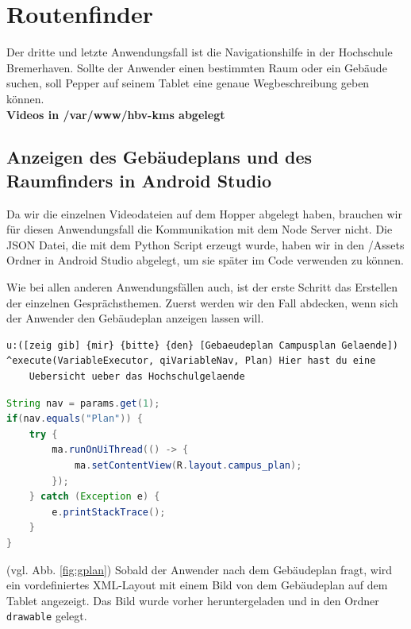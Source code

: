 \section{Routenfinder}

Der dritte und letzte Anwendungsfall ist die Navigationshilfe in der Hochschule Bremerhaven. Sollte der Anwender einen bestimmten Raum oder ein Gebäude suchen, soll Pepper auf seinem Tablet eine genaue Wegbeschreibung geben können. 
\\
\textbf{Videos in /var/www/hbv-kms abgelegt}
\\


\subsection{Anzeigen des Gebäudeplans und des Raumfinders in Android Studio}

Da wir die einzelnen Videodateien auf dem Hopper abgelegt haben, brauchen wir für diesen Anwendungsfall die Kommunikation mit dem Node Server nicht. 
Die JSON Datei, die mit dem Python Script erzeugt wurde, haben wir in den /Assets Ordner in Android Studio abgelegt, um sie später im Code verwenden zu können. 

Wie bei allen anderen Anwendungsfällen auch, ist der erste Schritt das Erstellen der einzelnen Gesprächsthemen. 
Zuerst werden wir den Fall abdecken, wenn sich der Anwender den Gebäudeplan anzeigen lassen will.\\

\begin{lstlisting}
u:([zeig gib] {mir} {bitte} {den} [Gebaeudeplan Campusplan Gelaende])
^execute(VariableExecutor, qiVariableNav, Plan) Hier hast du eine 
    Uebersicht ueber das Hochschulgelaende
\end{lstlisting}


\begin{lstlisting}[language=Java]
String nav = params.get(1);
if(nav.equals("Plan")) {
    try {
        ma.runOnUiThread(() -> {
            ma.setContentView(R.layout.campus_plan);
        });
    } catch (Exception e) {
        e.printStackTrace();
    }
}
\end{lstlisting}

(vgl. Abb. \ref{fig:gplan}) Sobald der Anwender nach dem Gebäudeplan fragt, wird ein vordefiniertes XML-Layout mit einem Bild von dem 
Gebäudeplan auf dem Tablet angezeigt. Das Bild wurde vorher heruntergeladen und in den Ordner 
\verb|drawable| gelegt.\\

